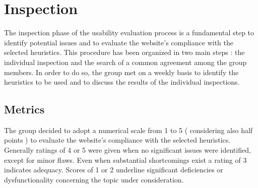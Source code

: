 \section{Inspection}
The inspection phase of the usability evaluation process is a fundamental step to identify potential issues and to evaluate the website's compliance with the selected heuristics. 
This procedure has been organized in two main steps : the individual inspection and the search of a common agreement among the group members.
In order to do so, the group met on a weekly basis to identify the heuristics to be used and to discuss the results of the individual inspections.

\subsection{Metrics}
The group decided to adopt a numerical scale from 1 to 5 ( considering also half points ) to evaluate the website's compliance with the selected heuristics.
Generally ratings of 4 or 5 were given when no significant issues were identified, except for minor flaws. 
Even when substantial shortcomings exist a rating of 3 indicates adequacy. 
Scores of 1 or 2 underline significant deficiencies or dysfunctionality concerning the topic under consideration.

